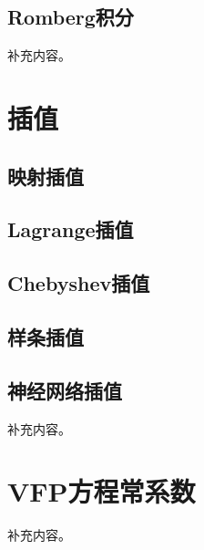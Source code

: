 \subsection{Romberg积分}

补充内容。


\section{插值}

\subsection{映射插值}
\subsection{Lagrange插值}
\subsection{Chebyshev插值}
\subsection{样条插值}
\subsection{神经网络插值}

补充内容。

\section{VFP方程常系数}

补充内容。
